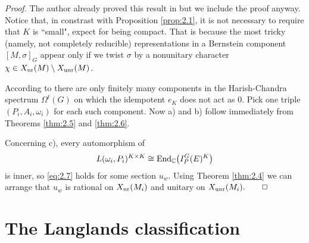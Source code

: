 \emph{Proof.} The author already proved this result in
\cite[Theorem 10]{Sol1} but we include the proof anyway. Notice
that, in constrast with Proposition \ref{prop:2.1}, it is not necessary
to require that $K$ is ``small", expect for being compact. That is
because the most tricky (namely, not completely reducible)
representations in a Bernstein component $[M,\sigma ]_G$ appear
only if we twist $\sigma$ by a nonunitary character $\chi \in
X_{\mathrm{nr}} (M) \setminus X_{\mathrm{unr}} (M)$.

According to \cite[Th\'eor\`eme VIII.1.2]{Wal} there are only
finitely many components in the Harish-Chandra spectrum $\Omega^t (G)$
on which the idempotent $e_K$ does not act as 0. Pick one triple
$(P_i ,A_i ,\omega_i )$ for each such component. Now a) and b)
follow immediately from Theorems \ref{thm:2.5} and \ref{thm:2.6}.

Concerning c), every automorphism of
\[
L(\omega_i ,P_i )^{K \times K} \cong \mathrm{End}_{\mathbb C} \big( I_P^G
(E)^K \big)
\]
is inner, so \eqref{eq:2.7} holds for some section $u_w$. Using
Theorem \ref{thm:2.4} we can arrange that $u_w$ is rational on
$X_{\mathrm{nr}} (M_i )$ and unitary on $X_{\mathrm{unr}} (M_i ). \qquad \Box$
\vspace{4mm}





\section{The Langlands classification}
\label{sec:2.3}

